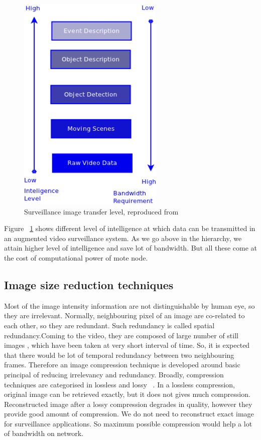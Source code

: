 \begin{figure}[!t]
\centering
\includegraphics[height=300pt]{Figures/image_tr_level}
\caption{Surveillance image transfer level, reproduced from ~\cite{3}}
\label{image_tr_level}
\end{figure}

Figure ~\ref{image_tr_level} shows different level of intelligence at
which data can be transmitted in an augmented video surveillance
system. As we go above in the hierarchy, we attain higher level of
intelligence and save lot of bandwidth. But all these come at the cost
of computational power of mote node.

\subsection{Image size reduction techniques}
Most of the image intensity information are not distinguishable by human
eye, so they are irrelevant. Normally, neighbouring pixel of an image
are co-related to each other, so they are redundant. Such redundancy is
called spatial redundancy.Coming to the video, they are composed of
large number of still images , which have been taken at very short
interval of time. So, it is expected that there would be lot of temporal
redundancy between two neighbouring frames.  Therefore an image
compression technique is developed around basic principal of reducing
irrelevancy and redundancy. Broadly, compression techniques are
categorised in lossless and lossy ~\cite{6}. In a lossless compression, original
image can be retrieved exactly, but it does not gives much compression.
Reconstructed image after a lossy compression degrades in quality,
however they provide good amount of compression. We do not need to
reconstruct exact image for surveillance applications. So maximum
possible compression would help a lot of bandwidth on network.\\

